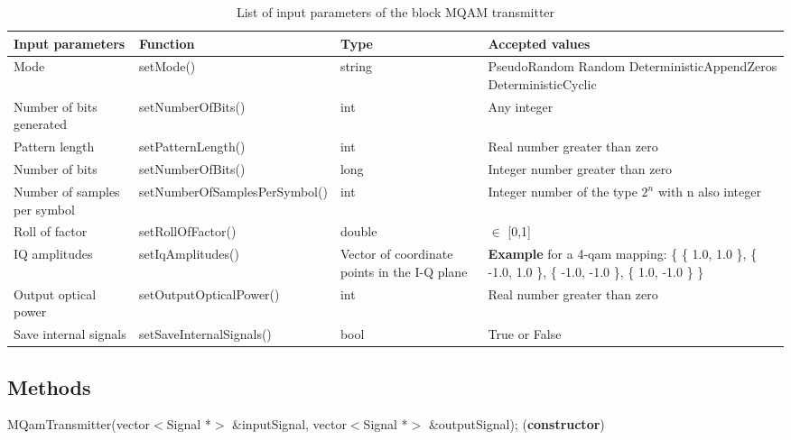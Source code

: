 \begin{table}[h]
\begin{center}
	\begin{tabular}{| m{3cm} | m{6cm} |  m{2cm} | m{} | }
		\hline
		\textbf{Input parameters} & \textbf{Function} & Type & \textbf{Accepted values} \\ \hline
		Mode & setMode() & string & PseudoRandom \newline Random \newline DeterministicAppendZeros \newline DeterministicCyclic \\ \hline
		Number of bits generated & setNumberOfBits() & int & Any integer\\ \hline
		Pattern length & setPatternLength() & int & Real number greater than zero\\ \hline
		Number of bits & setNumberOfBits() & long & Integer number greater than zero\\ \hline
		Number of samples per symbol & setNumberOfSamplesPerSymbol() & int & Integer number of the type $2^n$ with n also integer\\ \hline
		Roll of factor & setRollOfFactor() & double & $\in$ [0,1] \\ \hline
		IQ amplitudes & setIqAmplitudes() & Vector of coordinate points in the I-Q plane & \textbf{Example} for a 4-qam mapping: \{ \{ 1.0, 1.0 \}, \{ -1.0, 1.0 \}, \{ -1.0, -1.0 \}, \{ 1.0, -1.0 \} \} \\ \hline
		Output optical power & setOutputOpticalPower() & int & Real number greater than zero\\ \hline
		Save internal signals & setSaveInternalSignals() & bool & True or False\\
		\hline
	\end{tabular}
	\caption{List of input parameters of the block MQAM transmitter} \label{table}
\end{center}
\end{table}


\pagebreak

\subsection*{Methods}

MQamTransmitter(vector$<$Signal *$>$ \&inputSignal, vector$<$Signal *$>$ \&outputSignal); (\textbf{constructor})
\bigbreak

